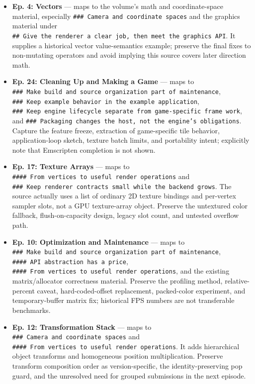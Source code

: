 \begin{itemize}
\item
  \textbf{Ep. 4: Vectors} --- maps to the volume's math and coordinate-space material, especially \texttt{\#\#\#\ Camera\ and\ coordinate\ spaces} and the graphics material under \texttt{\#\#\ Give\ the\ renderer\ a\ clear\ job,\ then\ meet\ the\ graphics\ API}. It supplies a historical vector value-semantics example; preserve the final fixes to non-mutating operators and avoid implying this source covers later direction math.
\item
  \textbf{Ep. 24: Cleaning Up and Making a Game} --- maps to \texttt{\#\#\#\ Make\ build\ and\ source\ organization\ part\ of\ maintenance}, \texttt{\#\#\#\ Keep\ example\ behavior\ in\ the\ example\ application}, \texttt{\#\#\#\ Keep\ engine\ lifecycle\ separate\ from\ game-specific\ frame\ work}, and \texttt{\#\#\#\ Packaging\ changes\ the\ host,\ not\ the\ engine’s\ obligations}. Capture the feature freeze, extraction of game-specific tile behavior, application-loop sketch, texture batch limits, and portability intent; explicitly note that Emscripten completion is not shown.
\item
  \textbf{Ep. 17: Texture Arrays} --- maps to \texttt{\#\#\#\#\ From\ vertices\ to\ useful\ render\ operations} and \texttt{\#\#\#\ Keep\ renderer\ contracts\ small\ while\ the\ backend\ grows}. The source actually uses a list of ordinary 2D texture bindings and per-vertex sampler slots, not a GPU texture-array object. Preserve the untextured color fallback, flush-on-capacity design, legacy slot count, and untested overflow path.
\item
  \textbf{Ep. 10: Optimization and Maintenance} --- maps to \texttt{\#\#\#\ Make\ build\ and\ source\ organization\ part\ of\ maintenance}, \texttt{\#\#\#\#\ API\ abstraction\ has\ a\ price}, \texttt{\#\#\#\#\ From\ vertices\ to\ useful\ render\ operations}, and the existing matrix/allocator correctness material. Preserve the profiling method, relative-percent caveat, hard-coded-offset replacement, packed-color experiment, and temporary-buffer matrix fix; historical FPS numbers are not transferable benchmarks.
\item
  \textbf{Ep. 12: Transformation Stack} --- maps to \texttt{\#\#\#\ Camera\ and\ coordinate\ spaces} and \texttt{\#\#\#\#\ From\ vertices\ to\ useful\ render\ operations}. It adds hierarchical object transforms and homogeneous position multiplication. Preserve transform composition order as version-specific, the identity-preserving pop guard, and the unresolved need for grouped submissions in the next episode.

\end{itemize}
